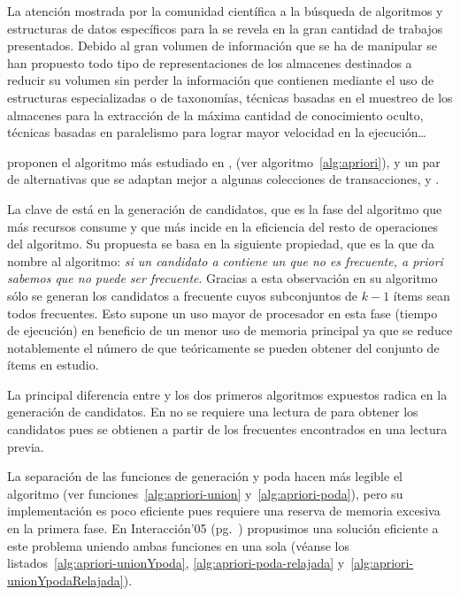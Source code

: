 
La atención mostrada por la comunidad científica a la búsqueda de algoritmos y estructuras de datos específicos para la \fim se revela en la gran cantidad de trabajos presentados. Debido al gran volumen de información que se ha de manipular se han propuesto todo tipo de representaciones de los almacenes \D destinados a reducir su volumen sin perder la información que contienen mediante el uso de estructuras especializadas o de taxonomías, técnicas basadas en el muestreo de los almacenes \D para la extracción de la máxima cantidad de conocimiento oculto, técnicas basadas en paralelismo para lograr mayor velocidad en la ejecución\ldots

\citet{AgrawalSrikant-FastAlgorithmsForMiningAssociationRules-1994} proponen el algoritmo más estudiado en \ARM, \apriori (ver algoritmo~\ref{alg:apriori}), y un par de alternativas que se adaptan mejor a algunas colecciones de transacciones,  y .

La clave de \apriori está en la generación de candidatos, que es la fase del algoritmo que más recursos consume y que más incide en la eficiencia del resto de operaciones del algoritmo. Su propuesta se basa en la siguiente propiedad, que es la que da nombre al algoritmo: \emph{si un candidato a \kitemset contiene un \kitemset[k-1] que no es frecuente, \textsl{a priori} sabemos que no puede ser frecuente}. Gracias a esta observación en su algoritmo sólo se generan los candidatos a \kitemset frecuente cuyos subconjuntos de $k-1$ ítems sean todos frecuentes. Esto supone un uso mayor de procesador en esta fase (tiempo de ejecución) en beneficio de un menor uso de memoria principal ya que se reduce notablemente el número de \itemsets que teóricamente se pueden obtener del conjunto \I de ítems en estudio.

La principal diferencia entre \apriori y los dos primeros algoritmos expuestos radica en la generación de candidatos. En \apriori no se requiere una lectura de \D para obtener los candidatos pues se obtienen a partir de los \itemsets frecuentes encontrados en una lectura previa.

La separación de las funciones de generación y poda hacen más legible el algoritmo (ver funciones~\ref{alg:apriori-union} y~\ref{alg:apriori-poda}), pero su implementación es poco eficiente pues requiere una reserva de memoria excesiva en la primera fase. En Interacción'05 (pg.~\pageref{sec:nuestro-Mejora-2005}) propusimos una solución eficiente a este problema uniendo ambas funciones en una sola (véanse los listados~\ref{alg:apriori-unionYpoda}, \ref{alg:apriori-poda-relajada} y~\ref{alg:apriori-unionYpodaRelajada}).

